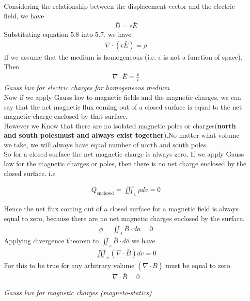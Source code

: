 Considering the relationship between the displacement vector and the electric field, we have 
\begin{align}
	\boxed{\bar{D} = \epsilon\bar{E}}
\end{align}
Substituting equation 5.8 into 5.7, we have
\begin{align*}
	\nabla \cdot (\epsilon\bar{E}) = \rho
\end{align*}
If we assume that the medium is homogeneous (i.e. $\epsilon$ is not a function of space). Then
\begin{align} 
	\boxed{\nabla \cdot \bar{E} = \frac{\rho}{\epsilon}}
\end{align} 
\emph{Gauss law for electric charges for homogeneous medium}\\

Now if we apply Gauss law to magnetic fields and the magnetic charges, we can say that the net magnetic flux coming out of a closed surface is equal to the net magnetic charge enclosed by that surface.\\


However we Know that there are no isolated magnetic poles or charges(\textbf{north and south polesmust and always exist together}).No matter what volume we take, we will always have equal number of north and south poles.\\
So for a closed surface the net magnetic charge is always zero. If we apply Gauss law for the magnetic charges or poles, then there is no net charge enclosed by the closed surface. i.e

\begin{align*}
	Q_{\text{enclosed}} = \iiint_v\rho dv = 0
\end{align*}

Hence the net flux coming out of a closed surface for a magnetic field is always equal to zero, because there are no net magnetic charges enclosed by the surface.
\begin{align*}
	\phi = \iint_s\bar{B}\cdot d\bar{a} = 0
\end{align*}
Applying divergence theorem to $\iint_s\bar{B}\cdot d\bar{a}$ we have
\begin{align*}
	\iiint_v(\nabla \cdot \bar{B})dv = 0
\end{align*}	
For this to be true for any arbitrary volume $(\nabla \cdot \bar{B})$ must be equal to zero.
\begin{align}
	\boxed{\nabla \cdot \bar{B} = 0}
\end{align}
\begin{center}
	\emph{Gauss law for magnetic charges (magneto-statics)}
\end{center}



